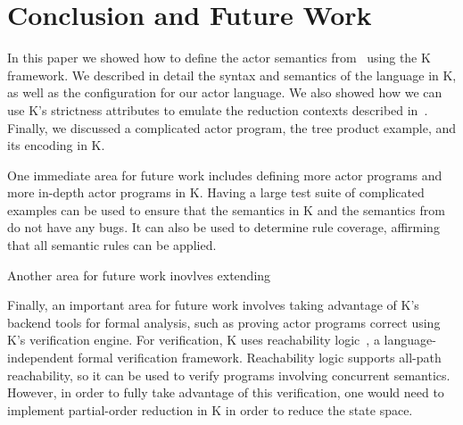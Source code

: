 \documentclass{llncs}
\begin{document}
\section{Conclusion and Future Work}

In this paper we showed how to define the actor semantics from~\cite{} using the
K framework. We described in detail the syntax and semantics of the language in
K, as well as the configuration for our actor language. We also showed how we
can use K's strictness attributes to emulate the reduction contexts described
in~\cite{}. Finally, we discussed a complicated actor program, the tree product
example, and its encoding in K.

One immediate area for future work includes defining more actor programs and
more in-depth actor programs in K. Having a large test suite of complicated
examples can be used to ensure that the semantics in K and the semantics
from~\cite{} do not have any bugs. It can also be used to determine rule
coverage, affirming that all semantic rules can be applied.

Another area for future work inovlves extending

Finally, an important area for future work involves taking advantage of K's
backend tools for formal analysis, such as proving actor programs correct using
K's verification engine. For verification, K uses reachability logic~\cite{}, a
language-independent formal verification framework. Reachability logic supports
all-path reachability, so it can be used to verify programs involving concurrent
semantics. However, in order to fully take advantage of this verification, one
would need to implement partial-order reduction in K in order to reduce the
state space.

%
%



\end{document}
